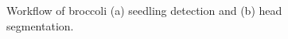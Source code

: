 \begin{figure}[htb]
  \begin{center}
  \end{center}
  \caption[Workflow of broccoli seedling detection and head segmentation]{
    Workflow of broccoli (a) seedling detection and (b) head segmentation.
  }
  \label{fig:bro6}
\end{figure}